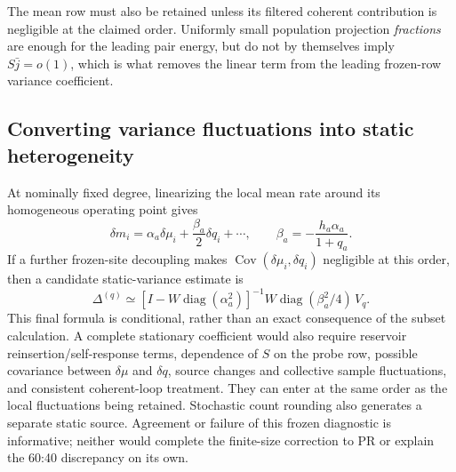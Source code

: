 The mean row must also be retained unless its filtered coherent contribution
is negligible at the claimed order. Uniformly small population projection
\emph{fractions} are enough for the leading pair energy, but do not by
themselves imply $S\bar j=o(1)$, which is what removes the linear term from
the leading frozen-row variance coefficient.

\subsection{Converting variance fluctuations into static heterogeneity}
At nominally fixed degree, linearizing the local mean rate around its
homogeneous operating point gives
\[
 \delta m_i=\alpha_a\delta\mu_i+\frac{\beta_a}{2}\delta q_i+\cdots,
 \qquad \beta_a=-\frac{h_a\alpha_a}{1+q_a}.
\]
If a further frozen-site decoupling makes
$\operatorname{Cov}(\delta\mu_i,\delta q_i)$ negligible at this order,
then a candidate static-variance estimate is
\[
 \Delta^{(q)}\simeq
 [I-W\operatorname{diag}(\alpha_a^2)]^{-1}
 W\operatorname{diag}(\beta_a^2/4)\,V_q.
\]
This final formula is conditional, rather than an exact consequence of the
subset calculation. A complete stationary coefficient would also require
reservoir reinsertion/self-response terms, dependence of $S$ on the probe
row, possible covariance between $\delta\mu$ and $\delta q$, source changes
and collective sample fluctuations, and consistent coherent-loop treatment.
They can enter at the same order as the local fluctuations being retained.
Stochastic count rounding also generates a separate static source. Agreement
or failure of this frozen diagnostic is informative; neither would complete
the finite-size correction to PR or explain the 60:40 discrepancy on its own.
